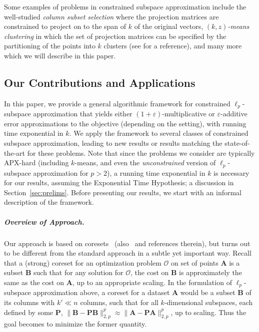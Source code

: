\documentclass[11pt]{article}
\theoremstyle{plain}
\theoremstyle{plain}
\theoremstyle{definition}
\theoremstyle{plain}
\theoremstyle{remark}
\begin{document}
Some examples of problems in constrained subspace approximation include the well-studied {\em column subset selection} \cite{boutsidis2009improved, tropp2009column, deshpande2010efficient, civril2012column,guruswami2012optimal,boutsidis2014near,altschuler2016greedy} where the projection matrices are constrained to project on to the span of $k$ of the original vectors, {\em $(k,z)$-means clustering} in which the set of projection matrices can be specified by the partitioning of the points into $k$ clusters (see \cite{cohen2015dimensionality} for a reference), and many more which we will describe in this paper.




\subsection{Our Contributions and Applications}
In this paper, we provide a general algorithmic framework for constrained $\ell_p$-subspace approximation that yields either $(1+\varepsilon)$-multiplicative or $\varepsilon$-additive error approximations to the objective (depending on the setting), with running time  exponential in $k$. We apply the framework to several classes of constrained subspace approximation, leading to new results or results matching the state-of-the-art for these problems. Note that since the problems we consider are typically APX-hard (including $k$-means, and even the \emph{unconstrained} version of $\ell_p$-subspace approximation for $p > 2$), a running time exponential in $k$ is necessary for our results, assuming the Exponential Time Hypothesis; a discussion in Section~\ref{sec:prelims}. Before presenting our results, we start with an informal description of the framework. 

\vspace{-6pt}
\subparagraph*{Overview of Approach.} Our approach is based on coresets~\cite{feldman2007ptas} (also~\cite{kmeans-coreset-21, cohenkmeanscoreset2022, Huang2024coresetoptimallb} and references therein), but turns out to be different from the standard approach in a subtle yet important way. Recall that a (strong) coreset for an optimization problem $\mathcal{O}$ on set of points $\bm{A}$ is a subset $\bm{B}$ such that for any solution for $\mathcal{O}$, the cost on $\bm{B}$ is approximately the same as the cost on $\bm{A}$, up to an appropriate scaling. In the formulation of $\ell_p$-subspace approximation above, a coreset for a dataset $\bm{A}$ would be a subset $\bm{B}$ of its columns with $k' \ll n$ columns, such that for all $k$-dimensional subspaces, each defined by some $\bm{P}$, $\| \bm{B} - \bm{P} \bm{B}\|_{2,p}^p \approx \|\bm{A} - \bm{P} \bm{A}\|_{2,p}^p$, up to scaling. Thus the goal becomes to minimize the former quantity.
\end{document}
